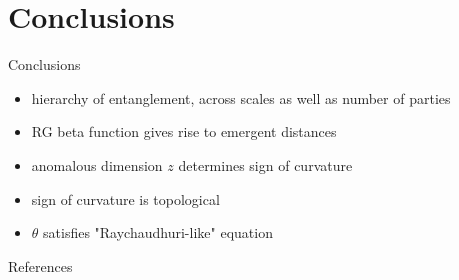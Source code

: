 \documentclass[12pt,aspectratio=169]{beamer}
\begin{document}
\section{Conclusions}
\begin{frame}{Conclusions}
	\begin{itemize}[<+-|alert@+>]
		\item hierarchy of entanglement, across scales as well as number of parties\\[20pt]
			\only<1>{
			\[S_{A \cup B} = S_{\text{larger}}\]}
		\item RG beta function gives rise to emergent distances\\[20pt]
			\only<2>{
			\[x_z(\beta), y_z(\beta)\]}
		\item anomalous dimension \(z\) determines sign of curvature\\[20pt]
			\only<3>{
			\[\kappa \begin{cases}
				> 0 \text{ if }z < 0\\
				= 0 \text{ if }z = 1 \\
				< 0 \text{ if }z > 1 \\
			\end{cases}\]}
		\item sign of curvature is topological\\[20pt]
			\only<4>{
			\[\text{sign}\left[\kappa_z\right] = \mathcal{W}_z\left( \gamma^* \right) \times \left[2\mathcal{W}^\prime_z\left( \alpha^* \right) - 1\right] \]}
		\item \(\theta\) satisfies "Raychaudhuri-like" equation
			\only<5>{
			\[\frac{\:\mathrm{d}\theta_z}{\:\mathrm{d}x_z} = \kappa\]}
	\end{itemize}
\end{frame}

\begin{frame}[allowframebreaks]{References}
\printbibliography
\end{frame}
\end{document}
